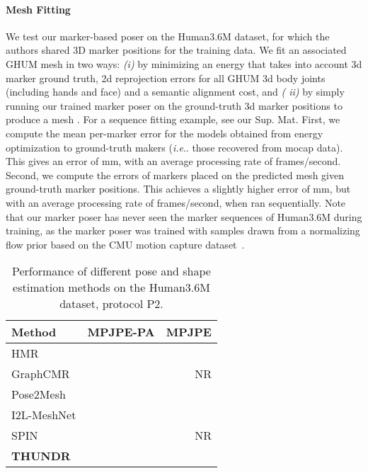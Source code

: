 \documentclass[10pt,twocolumn,letterpaper]{article}
\makeatletter
\DeclareRobustCommand\onedot{\futurelet\@let@token\@onedot}
\def\@onedot{\ifx\@let@token.\else.\null\fi\xspace}
\def\ie{\emph{i.e}\onedot} \def\Ie{\emph{I.e}\onedot}
\makeatother
\begin{document}
\paragraph{Mesh Fitting} 
We test our marker-based poser on the Human3.6M dataset, for which the authors shared 3D marker positions for the training data. We fit an associated GHUM mesh in two ways: {\it (i)} by minimizing an energy that takes into account 3d marker ground truth, 2d reprojection errors for all GHUM 3d body joints (including hands and face) and a semantic alignment cost, and {\it ( ii)} by simply running our trained marker poser on the ground-truth 3d marker positions to produce a mesh . For a sequence fitting example, see our Sup. Mat.
First, we compute the mean per-marker error for the models  obtained from energy optimization to ground-truth makers  (\ie those recovered from mocap data). This gives an error of  mm, with an average processing rate of  frames/second. Second, we compute the errors of markers placed on the predicted mesh  given ground-truth marker positions. This achieves a slightly higher error of  mm, but with an average processing rate of  frames/second, when ran sequentially. Note that our marker poser has never seen the marker sequences of Human3.6M during training, as the marker poser was trained with samples drawn from a normalizing flow prior based on the CMU motion capture dataset~\cite{CMUMocap}.\begin{table}[!htbp]
    \small
    \centering
    \begin{tabular}[t]{|l||r|r|}
    \hline
    \textbf{Method}  & {MPJPE-PA} & {MPJPE} \\ 
    \hline
    \hline
    HMR \cite{Kanazawa2018} &  & \\
    \hline
    GraphCMR \cite{kolotouros2019convolutional} &  &NR \\
    \hline
    Pose2Mesh \cite{choi2020pose2mesh} &  & \\
    \hline
    I2L-MeshNet \cite{moon2020MeshNet} &  &  \\
\hline
    SPIN \cite{kolotouros2019learning} &  &NR\\
\hline
    \hline
    \textbf{THUNDR} &  &   \\
    \hline
    \end{tabular}
    \vspace{-3mm}
    \caption{\small Performance of different pose and shape estimation methods on the Human3.6M dataset, protocol P2.}
\label{tbl:H36MP2}
\end{table}
\end{document}
